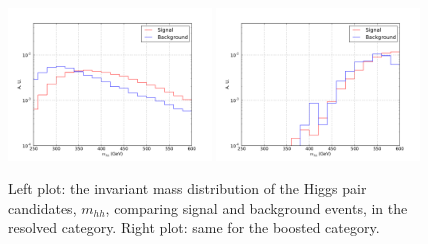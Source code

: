 \begin{figure}[t]
\begin{center}
  \includegraphics[width=0.48\textwidth]{plots/m_HH_res_C1.pdf}
  \includegraphics[width=0.48\textwidth]{plots/m_HH_boost_C1.pdf}
  \caption{\small Left plot: the invariant mass distribution of the Higgs
    pair candidates, $m_{hh}$, comparing signal and background events,
    in the resolved category.
    Right plot: same for the boosted category.
}
\label{fig:mhh}
\end{center}
\end{figure}







